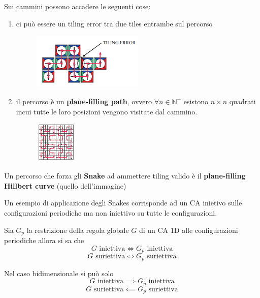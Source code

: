 Sui cammini possono accadere le seguenti cose:
\begin{enumerate}
    \item ci può essere un tiling error tra due tiles entrambe sul percorso
    \begin{figure}[!h]
        \centering
        \includegraphics[width=0.5\textwidth]{img/sistemi_complessi/snake1.png}
    \end{figure}
    \item il percorso è un \textbf{plane-filling path}, ovvero $\forall n\in \mathbb{N}^+$
    esistono $n\times n$ quadrati incui tutte le loro posizioni vengono visitate 
    dal cammino.
    \begin{figure}[!h]
        \centering
        \includegraphics[width=0.2\textwidth]{img/sistemi_complessi/snake2.png}
    \end{figure}
\end{enumerate}


\begin{nota}
    Un percorso che forza gli \textbf{Snake} ad ammettere tiling valido è il \textbf{
        plane-filling Hillbert curve} (quello dell'immagine)
\end{nota}

\begin{esempio}
    Un esempio di applicazione degli Snakes corrisponde ad un CA inietivo sulle configurazioni periodiche
    ma non iniettivo su tutte le configurazioni.
\end{esempio}

Sia $G_p$ la restrizione della regola globale $G$ di un CA 1D alle configurazioni 
periodiche allora 
si sa che
$$G \text{ iniettiva} \iff G_p \text{ iniettiva}$$
$$G \text{ suriettiva} \iff G_p \text{ suriettiva}$$

Nel caso bidimensionale si può solo 
$$G \text{ iniettiva} \implies G_p \text{ iniettiva}$$
$$G \text{ suriettiva} \impliedby G_p \text{ suriettiva}$$


